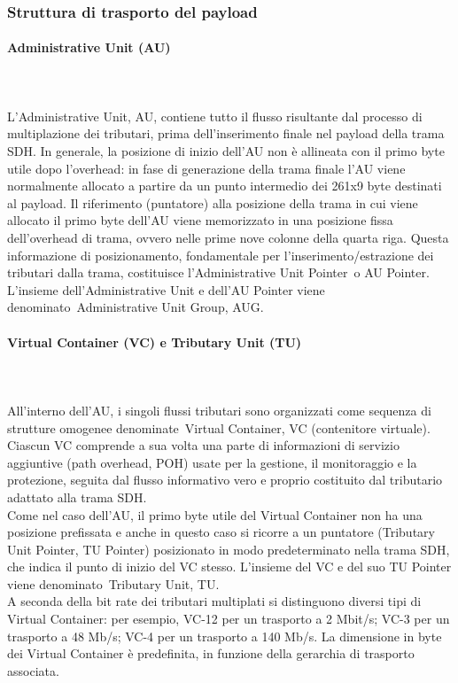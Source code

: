 \documentclass[8pt]{extarticle}
\begin{document}
\subsubsection{Struttura di trasporto del payload}
\paragraph{Administrative Unit (AU)}
\noindent
\\\\
L'Administrative Unit, AU, contiene tutto il flusso risultante dal processo di multiplazione dei tributari,
 prima dell'inserimento finale nel payload della trama SDH.
In generale, la posizione di inizio dell'AU non è allineata con il primo byte utile dopo l'overhead: 
in fase di generazione della trama finale l'AU viene normalmente allocato a partire da un punto intermedio 
dei 261x9 byte destinati al payload. Il riferimento (puntatore) alla posizione della trama in cui viene 
allocato il primo byte dell'AU viene memorizzato in una posizione fissa dell'overhead di trama, ovvero 
nelle prime nove colonne della quarta riga. Questa informazione di posizionamento, fondamentale per 
l'inserimento/estrazione dei tributari dalla trama, costituisce l'Administrative Unit Pointer o AU Pointer. 
L'insieme dell'Administrative Unit e dell'AU Pointer viene denominato Administrative Unit Group, AUG.
\paragraph{Virtual Container (VC) e Tributary Unit (TU)}
\noindent
\\\\
All'interno dell'AU, i singoli flussi tributari sono organizzati come sequenza di strutture omogenee 
denominate Virtual Container, VC (contenitore virtuale). Ciascun VC comprende a sua volta una parte 
di informazioni di servizio aggiuntive (path overhead, POH) usate per la gestione, il monitoraggio e la 
protezione, seguita dal flusso informativo vero e proprio costituito dal tributario adattato alla trama SDH.\\
Come nel caso dell'AU, il primo byte utile del Virtual Container non ha una posizione prefissata e anche 
in questo caso si ricorre a un puntatore (Tributary Unit Pointer, TU Pointer) posizionato in modo 
predeterminato nella trama SDH, che indica il punto di inizio del VC stesso. L'insieme del VC e del suo 
TU Pointer viene denominato Tributary Unit, TU.\\
A seconda della bit rate dei tributari multiplati si distinguono diversi tipi di Virtual Container: 
per esempio, VC-12 per un trasporto a 2 Mbit/s; VC-3 per un trasporto a 48 Mb/s; VC-4 per un trasporto 
a 140 Mb/s. La dimensione in byte dei Virtual Container è predefinita, in funzione della gerarchia di 
trasporto associata.
\end{document}

